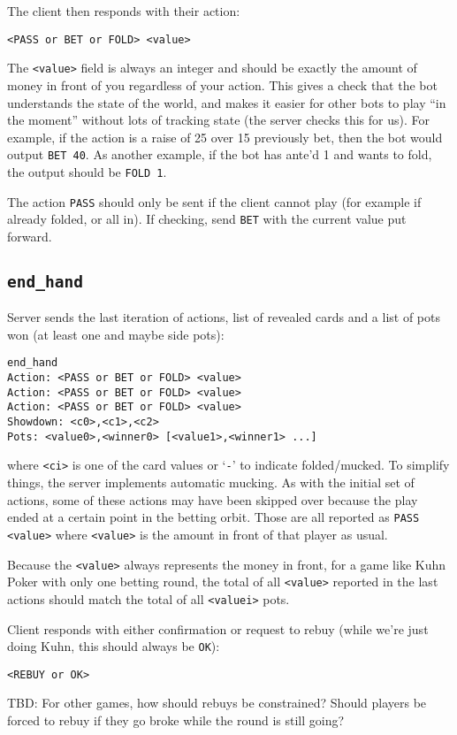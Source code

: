 \documentclass{article}
\begin{document}
The client then responds with their action:
\begin{verbatim}
<PASS or BET or FOLD> <value>
\end{verbatim}
The \texttt{<value>} field is always an integer and should be exactly
the amount of money in front of you regardless of your action.
This gives a check that the bot understands the state of the world,
and makes it easier for other bots to play ``in the moment'' without
lots of tracking state (the server checks this for us).
For example, if the action is a raise of 25 over 15 previously bet, then
the bot would output \texttt{BET 40}. As another example, if the
bot has ante'd 1 and wants to fold, the output should be \texttt{FOLD 1}.

The action \texttt{PASS} should only be sent if the client cannot
play (for example if already folded, or all in). If checking,
send \texttt{BET} with the current value put forward.

\subsection{\texttt{end\_hand}}
Server sends the last iteration of actions,
list of revealed cards and a list of pots won
(at least one and maybe side pots):
\begin{verbatim}
end_hand
Action: <PASS or BET or FOLD> <value>
Action: <PASS or BET or FOLD> <value>
Action: <PASS or BET or FOLD> <value>
Showdown: <c0>,<c1>,<c2>
Pots: <value0>,<winner0> [<value1>,<winner1> ...]
\end{verbatim}
where \texttt{<ci>} is one of the card values or `\texttt{-}'
to indicate folded/mucked. To simplify things,
the server implements automatic mucking. As with the initial
set of actions, some of these actions may have been skipped over
because the play ended at a certain point in the betting orbit.
Those are all reported as \texttt{PASS <value>} where \texttt{<value>}
is the amount in front of that player as usual.

Because the
\texttt{<value>} always represents the money in front, for
a game like Kuhn Poker with only one betting round, the total
of all \texttt{<value>} reported in the last actions
should match the total of all \texttt{<valuei>} pots.

Client responds with either confirmation or request to rebuy
(while we're just doing Kuhn, this should always be \texttt{OK}):
\begin{verbatim}
<REBUY or OK>
\end{verbatim}
TBD: For other games, how should rebuys be constrained? Should players be forced to
rebuy if they go broke while the round is still going?
\end{document}
